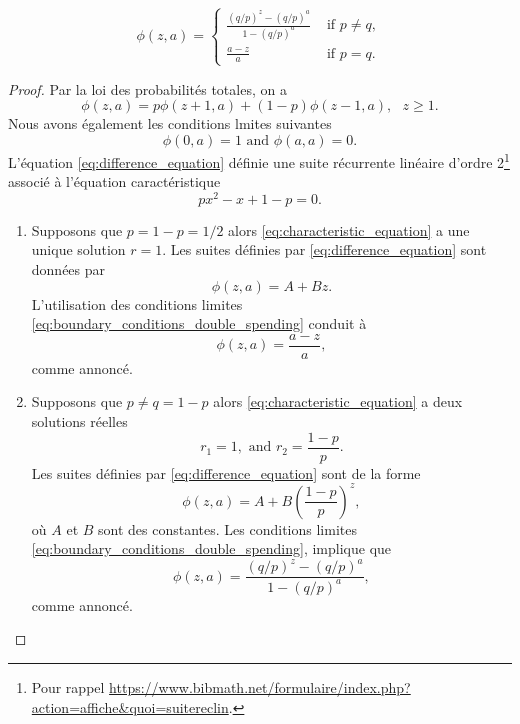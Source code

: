 \begin{theo}\label{theo_ruin_proba}
\begin{equation}\label{eq:gambler_ruin}
\phi(z,a) = \begin{cases}
\frac{(q/p)^z-(q/p)^a}{1 - (q/p)^a}&\text{ if }p\neq q,\\
\frac{a-z}{a}&\text{ if }p= q.
\end{cases}
\end{equation}
\end{theo}
\begin{proof}
Par la loi des probabilités totales, on a
\begin{equation}\label{eq:difference_equation}
\phi(z,a) = p\phi(z+1,a)+(1-p)\phi(z-1,a),\text{ }z\geq1.
\end{equation}
Nous avons également les conditions lmites suivantes
\begin{equation}\label{eq:boundary_conditions_double_spending}
\phi(0,a) = 1\text{ and }\phi(a,a) = 0.
\end{equation}
L'équation \eqref{eq:difference_equation} définie une suite récurrente linéaire d'ordre 2\footnote{Pour rappel \url{https://www.bibmath.net/formulaire/index.php?action=affiche&quoi=suitereclin}.} associé à l'équation caractéristique
\begin{equation}\label{eq:characteristic_equation}
px^2 - x + 1-p = 0.
\end{equation}
\begin{enumerate}

\item Supposons que $p=1-p=1/2$ alors \eqref{eq:characteristic_equation} a une unique solution $r = 1$. Les suites définies par \eqref{eq:difference_equation} sont données par
$$
\phi(z,a) = A+Bz.
$$
L'utilisation des conditions limites \eqref{eq:boundary_conditions_double_spending} conduit à
$$
\phi(z,a) = \frac{a-z}{a},
$$
comme annoncé.
\item Supposons que $p\neq q = 1-p$ alors \eqref{eq:characteristic_equation} a deux solutions réelles
$$
r_1 = 1, \text{ and }r_2 = \frac{1-p}{p}.
$$
Les suites définies par \eqref{eq:difference_equation} sont de la forme
$$
\phi(z,a)=A+B\left(\frac{1-p}{p}\right)^z,
$$
où $A$ et $B$ sont des constantes. Les conditions limites \eqref{eq:boundary_conditions_double_spending}, implique que
$$
\phi(z,a) = \frac{(q/p)^z-(q/p)^a}{1 - (q/p)^a},
$$
comme annoncé.
\end{enumerate}
\end{proof}

